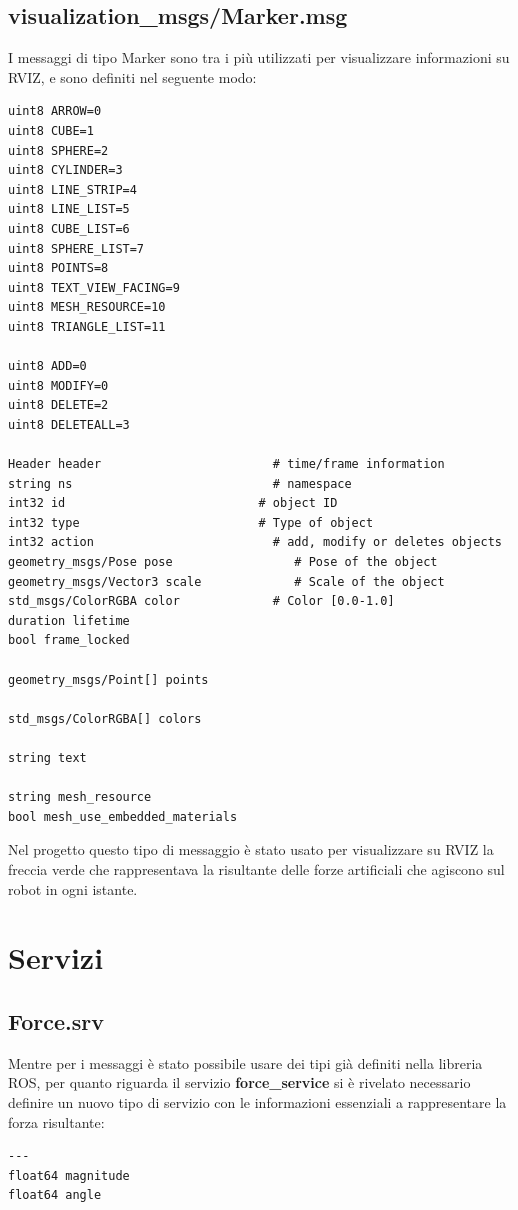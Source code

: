 \documentclass[Lau, binding=0.6cm, oneside]{sapthesis}
\begin{document}
\subsection{visualization\_msgs/Marker.msg}
I messaggi di tipo Marker sono tra i più utilizzati per visualizzare informazioni su RVIZ, e sono definiti nel seguente modo\cite{fonte7}:
\begin{lstlisting}
uint8 ARROW=0
uint8 CUBE=1
uint8 SPHERE=2
uint8 CYLINDER=3
uint8 LINE_STRIP=4
uint8 LINE_LIST=5
uint8 CUBE_LIST=6
uint8 SPHERE_LIST=7
uint8 POINTS=8
uint8 TEXT_VIEW_FACING=9
uint8 MESH_RESOURCE=10
uint8 TRIANGLE_LIST=11

uint8 ADD=0
uint8 MODIFY=0
uint8 DELETE=2
uint8 DELETEALL=3

Header header                        # time/frame information
string ns                            # namespace
int32 id                           # object ID
int32 type                         # Type of object
int32 action                         # add, modify or deletes objects
geometry_msgs/Pose pose                 # Pose of the object
geometry_msgs/Vector3 scale             # Scale of the object
std_msgs/ColorRGBA color             # Color [0.0-1.0]
duration lifetime
bool frame_locked

geometry_msgs/Point[] points

std_msgs/ColorRGBA[] colors

string text

string mesh_resource
bool mesh_use_embedded_materials
\end{lstlisting}	

Nel progetto questo tipo di messaggio è stato usato per visualizzare su RVIZ la freccia verde che rappresentava la risultante delle forze artificiali che agiscono sul robot in ogni istante.

\section{Servizi}
\subsection{Force.srv}
Mentre per i messaggi è stato possibile usare dei tipi già definiti nella libreria ROS, per quanto riguarda il servizio \textbf{force\_service} si è rivelato necessario definire un nuovo tipo di servizio con le informazioni essenziali a rappresentare la forza risultante:

\begin{lstlisting}
---
float64 magnitude
float64 angle
\end{lstlisting}
\end{document}

